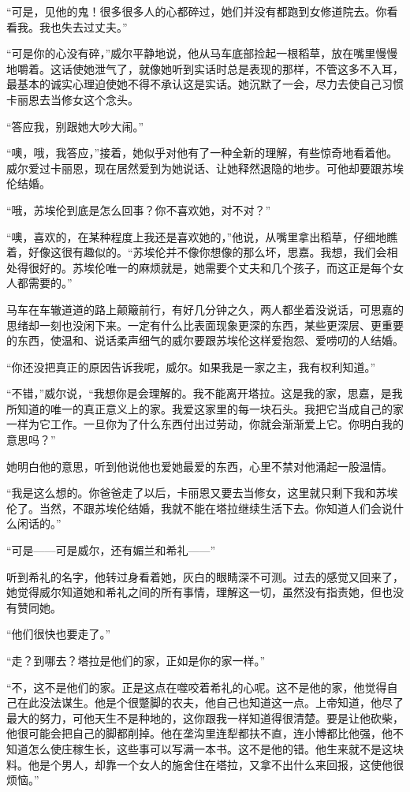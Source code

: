 \par “可是，见他的鬼！很多很多人的心都碎过，她们并没有都跑到女修道院去。你看看我。我也失去过丈夫。”
\par “可是你的心没有碎，”威尔平静地说，他从马车底部捡起一根稻草，放在嘴里慢慢地嚼着。这话使她泄气了，就像她听到实话时总是表现的那样，不管这多不入耳，最基本的诚实心理迫使她不得不承认这是实话。她沉默了一会，尽力去使自己习惯卡丽恩去当修女这个念头。
\par “答应我，别跟她大吵大闹。”
\par “噢，哦，我答应，”接着，她似乎对他有了一种全新的理解，有些惊奇地看着他。威尔爱过卡丽恩，现在居然爱到为她说话、让她释然退隐的地步。可他却要跟苏埃伦结婚。
\par “哦，苏埃伦到底是怎么回事？你不喜欢她，对不对？”
\par “噢，喜欢的，在某种程度上我还是喜欢她的，”他说，从嘴里拿出稻草，仔细地瞧着，好像这很有趣似的。“苏埃伦并不像你想像的那么坏，思嘉。我想，我们会相处得很好的。苏埃伦唯一的麻烦就是，她需要个丈夫和几个孩子，而这正是每个女人都需要的。”
\par 马车在车辙道道的路上颠簸前行，有好几分钟之久，两人都坐着没说话，可思嘉的思绪却一刻也没闲下来。一定有什么比表面现象更深的东西，某些更深层、更重要的东西，使温和、说话柔声细气的威尔要跟苏埃伦这样爱抱怨、爱唠叨的人结婚。
\par “你还没把真正的原因告诉我呢，威尔。如果我是一家之主，我有权利知道。”
\par “不错，”威尔说，“我想你是会理解的。我不能离开塔拉。这是我的家，思嘉，是我所知道的唯一的真正意义上的家。我爱这家里的每一块石头。我把它当成自己的家一样为它工作。一旦你为了什么东西付出过劳动，你就会渐渐爱上它。你明白我的意思吗？”
\par 她明白他的意思，听到他说他也爱她最爱的东西，心里不禁对他涌起一股温情。
\par “我是这么想的。你爸爸走了以后，卡丽恩又要去当修女，这里就只剩下我和苏埃伦了。当然，不跟苏埃伦结婚，我就不能在塔拉继续生活下去。你知道人们会说什么闲话的。”
\par “可是——可是威尔，还有媚兰和希礼——”
\par 听到希礼的名字，他转过身看着她，灰白的眼睛深不可测。过去的感觉又回来了，她觉得威尔知道她和希礼之间的所有事情，理解这一切，虽然没有指责她，但也没有赞同她。
\par “他们很快也要走了。”
\par “走？到哪去？塔拉是他们的家，正如是你的家一样。”
\par “不，这不是他们的家。正是这点在噬咬着希礼的心呢。这不是他的家，他觉得自己在此没法谋生。他是个很蹩脚的农夫，他自己也知道这一点。上帝知道，他尽了最大的努力，可他天生不是种地的，这你跟我一样知道得很清楚。要是让他砍柴，他很可能会把自己的脚都削掉。他在垄沟里连犁都扶不直，连小博都比他强，他不知道怎么使庄稼生长，这些事可以写满一本书。这不是他的错。他生来就不是这块料。他是个男人，却靠一个女人的施舍住在塔拉，又拿不出什么来回报，这使他很烦恼。”
